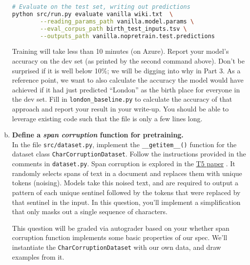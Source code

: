 \begin{enumerate}[(a)]
\begin{lstlisting}[language=bash]
# Evaluate on the test set, writing out predictions
python src/run.py evaluate vanilla wiki.txt  \
        --reading_params_path vanilla.model.params \
        --eval_corpus_path birth_test_inputs.tsv \
        --outputs_path vanilla.nopretrain.test.predictions
\end{lstlisting}

Training will take less than 10 minutes (on Azure).  Report your model's accuracy on the dev set (as printed by the second command above). Don't be surprised if it is well below 10\%; we will be digging into why in Part 3. As a reference point, we want to also calculate the accuracy the model would have achieved if it had just predicted ``London'' as the birth place for everyone in the dev set. Fill in \texttt{london\_baseline.py} to calculate the accuracy of that approach and report your result in your write-up. You should be able to leverage existing code such that the file is only a few lines long. 

\item {}  \textbf{Define a \textit{span corruption} function for pretraining.}\\
In the file \texttt{src/dataset.py}, implement the \texttt{\_\_getitem\_\_()} function for the dataset class \texttt{CharCorruptionDataset}.
Follow the instructions provided in the comments in \texttt{dataset.py}.
Span corruption is explored in the \href{https://arxiv.org/pdf/1910.10683.pdf}{T5 paper} \cite{raffel2020exploring}.
It randomly selects spans of text in a document and replaces them with unique tokens (noising).
Models take this noised text, and are required to output a pattern of each unique sentinel followed by the tokens that were replaced by that sentinel in the input.
In this question, you'll implement a simplification that only masks out a single sequence of characters.

This question will be graded via autograder based on your whether span corruption function implements some basic properties of our spec.
We'll instantiate the \texttt{CharCorruptionDataset} with our own data, and draw examples from it.


\end{enumerate}
